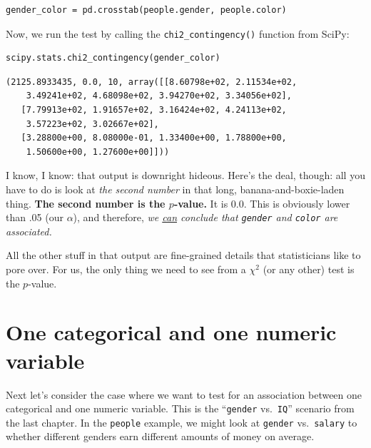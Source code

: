 \begin{Verbatim}[fontsize=\small,samepage=true,frame=single,framesep=3mm]
gender_color = pd.crosstab(people.gender, people.color)
\end{Verbatim}

Now, we run the test by calling the \texttt{chi2\_contingency()} function from
SciPy:

\begin{Verbatim}[fontsize=\footnotesize,samepage=true,frame=single,framesep=3mm]
scipy.stats.chi2_contingency(gender_color)
\end{Verbatim}
\vspace{-.2in}

\begin{Verbatim}[fontsize=\small,samepage=true,frame=leftline,framesep=5mm,framerule=1mm]
(2125.8933435, 0.0, 10, array([[8.60798e+02, 2.11534e+02, 
    3.49241e+02, 4.68098e+02, 3.94270e+02, 3.34056e+02],
   [7.79913e+02, 1.91657e+02, 3.16424e+02, 4.24113e+02, 
    3.57223e+02, 3.02667e+02],
   [3.28800e+00, 8.08000e-01, 1.33400e+00, 1.78800e+00, 
    1.50600e+00, 1.27600e+00]]))
\end{Verbatim}


I know, I know: that output is downright hideous. Here's the deal, though: all
you have to do is look at \textit{the second number} in that long,
banana-and-boxie-laden thing. \textbf{The second number is the $p$-value.} It is
0.0. This is obviously lower than .05 (our $\alpha$), and therefore, \textit{we
\underline{can} conclude that \texttt{gender} and \texttt{color} are
associated.}

All the other stuff in that output are fine-grained details that statisticians
like to pore over. For us, the only thing we need to see from a $\chi^2$ (or
any other) test is the $p$-value.

\section[One categorical, one numeric variable]{One categorical and one numeric variable}

Next let's consider the case where we want to test for an association between
one categorical and one numeric variable. This is the ``\texttt{gender}
vs.~\texttt{IQ}'' scenario from the last chapter. In the \texttt{people}
example, we might look at \texttt{gender} vs.~\texttt{salary} to whether
different genders earn different amounts of money on average.

